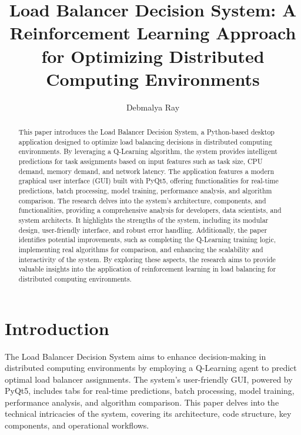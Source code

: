 \documentclass[runningheads]{llncs}
\begin{document}
\title{Load Balancer Decision System: A Reinforcement Learning Approach for Optimizing Distributed Computing Environments}
\author{Debmalya Ray}

\maketitle

\begin{abstract}
This paper introduces the Load Balancer Decision System, a Python-based desktop application designed to optimize load balancing decisions in distributed computing environments. By leveraging a Q-Learning algorithm, the system provides intelligent predictions for task assignments based on input features such as task size, CPU demand, memory demand, and network latency. The application features a modern graphical user interface (GUI) built with PyQt5, offering functionalities for real-time predictions, batch processing, model training, performance analysis, and algorithm comparison. The research delves into the system’s architecture, components, and functionalities, providing a comprehensive analysis for developers, data scientists, and system architects. It highlights the strengths of the system, including its modular design, user-friendly interface, and robust error handling. Additionally, the paper identifies potential improvements, such as completing the Q-Learning training logic, implementing real algorithms for comparison, and enhancing the scalability and interactivity of the system. By exploring these aspects, the research aims to provide valuable insights into the application of reinforcement learning in load balancing for distributed computing environments.
\end{abstract}


\section{Introduction}\label{introduction}
The Load Balancer Decision System aims to enhance decision-making in distributed computing environments by employing a Q-Learning agent to predict optimal load balancer assignments. The system’s user-friendly GUI, powered by PyQt5, includes tabs for real-time predictions, batch processing, model training, performance analysis, and algorithm comparison. This paper delves into the technical intricacies of the system, covering its architecture, code structure, key components, and operational workflows.
\end{document}
